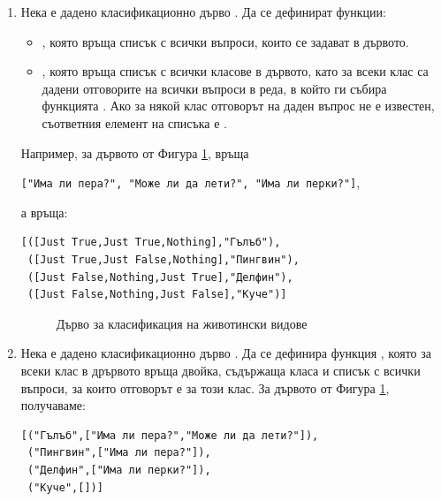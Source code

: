 \begin{enumerate}[resume]
	\item Нека е дадено класификационно дърво . Да се дефинират функции:
	\begin{itemize}
		\item {}, която връща списък с всички въпроси, които се задават в дървото.
		\item {}, която връща списък с всички класове в дървото, като за всеки клас са дадени отговорите на всички въпроси в реда, в който ги събира функцията . Ако за някой клас отговорът на даден въпрос не е известен, съответния елемент на списъка е .
	\end{itemize}
	Например, за дървото от Фигура \ref{fig:decisiontree},  връща 
	
	\verb#["Има ли пера?", "Може ли да лети?", "Има ли перки?"]#,
	
	а  връща:
\begin{verbatim}
[([Just True,Just True,Nothing],"Гълъб"),
 ([Just True,Just False,Nothing],"Пингвин"),
 ([Just False,Nothing,Just True],"Делфин"),
 ([Just False,Nothing,Just False],"Куче")]
\end{verbatim}


\begin{figure}[h]
	\centering
{}
	\caption{Дърво за класификация на животински видове}
	\label{fig:decisiontree}
\end{figure}

	\item Нека е дадено класификационно дърво . Да се дефинира функция , която за всеки клас в дрървото връща двойка, съдържаща класа и списък с всички въпроси, за които отговорът е  за този клас. За дървото от Фигура \ref{fig:decisiontree}, получаваме:
\begin{verbatim}
[("Гълъб",["Има ли пера?","Може ли да лети?"]),
 ("Пингвин",["Има ли пера?"]),
 ("Делфин",["Има ли перки?"]),
 ("Куче",[])]
\end{verbatim}


\end{enumerate}
